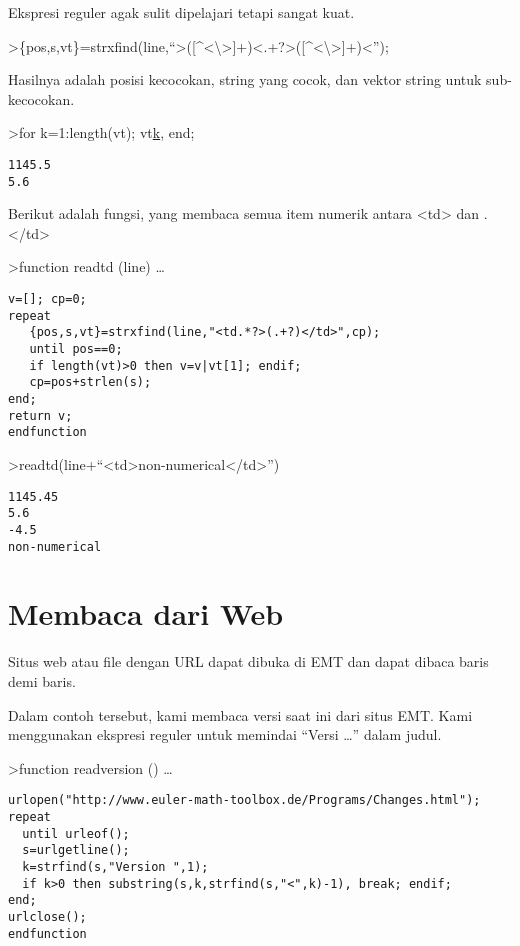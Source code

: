 \documentclass[
]{book}
\begin{document}
Ekspresi reguler agak sulit dipelajari tetapi sangat kuat.

\textgreater\{pos,s,vt\}=strxfind(line,``\textgreater({[}\^{}\textless\textbackslash\textgreater{]}+)\textless.+?\textgreater({[}\^{}\textless\textbackslash\textgreater{]}+)\textless{}'');

Hasilnya adalah posisi kecocokan, string yang cocok, dan vektor string untuk sub-kecocokan.

\textgreater for k=1:length(vt); vt\href{}{k}, end;

\begin{verbatim}
1145.5
5.6
\end{verbatim}

Berikut adalah fungsi, yang membaca semua item numerik antara \textless td\textgreater{} dan . \textless/td\textgreater{}

\textgreater function readtd (line) \ldots{}

\begin{verbatim}
v=[]; cp=0;
repeat
   {pos,s,vt}=strxfind(line,"<td.*?>(.+?)</td>",cp);
   until pos==0;
   if length(vt)>0 then v=v|vt[1]; endif;
   cp=pos+strlen(s);
end;
return v;
endfunction
\end{verbatim}

\textgreater readtd(line+``\textless td\textgreater non-numerical\textless/td\textgreater{}'')

\begin{verbatim}
1145.45
5.6
-4.5
non-numerical
\end{verbatim}

\section{Membaca dari Web}\label{membaca-dari-web}

Situs web atau file dengan URL dapat dibuka di EMT dan dapat dibaca baris demi baris.

Dalam contoh tersebut, kami membaca versi saat ini dari situs EMT. Kami menggunakan ekspresi reguler untuk memindai ``Versi \ldots{}'' dalam judul.

\textgreater function readversion () \ldots{}

\begin{verbatim}
urlopen("http://www.euler-math-toolbox.de/Programs/Changes.html");
repeat
  until urleof();
  s=urlgetline();
  k=strfind(s,"Version ",1);
  if k>0 then substring(s,k,strfind(s,"<",k)-1), break; endif;
end;
urlclose();
endfunction
\end{verbatim}
\end{document}

